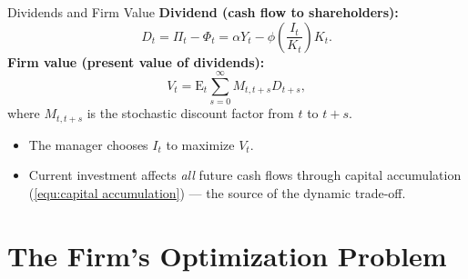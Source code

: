 \documentclass{beamer}
\begin{document}
\begin{frame}{Dividends and Firm Value}
	\textbf{Dividend (cash flow to shareholders):}
	\begin{equation}\label{equ:dividend}
		D_t=\Pi_t-\Phi_t=\alpha Y_t-\phi\!\left(\frac{I_t}{K_t}\right)K_t.
	\end{equation}
	\textbf{Firm value (present value of dividends):}
	\begin{equation}\label{equ:firm value}
		V_t=\mathrm{E}_t\sum_{s=0}^{\infty}M_{t,t+s}D_{t+s},
	\end{equation}
	where $M_{t,t+s}$ is the stochastic discount factor from $t$ to $t+s$.
	\begin{itemize}
		\item The manager chooses $I_t$ to maximize $V_t$.
		\item Current investment affects \textit{all} future cash flows through capital accumulation (\ref{equ:capital accumulation}) --- the source of the dynamic trade-off.
	\end{itemize}
\end{frame}

\section{The Firm's Optimization Problem}
\end{document}
